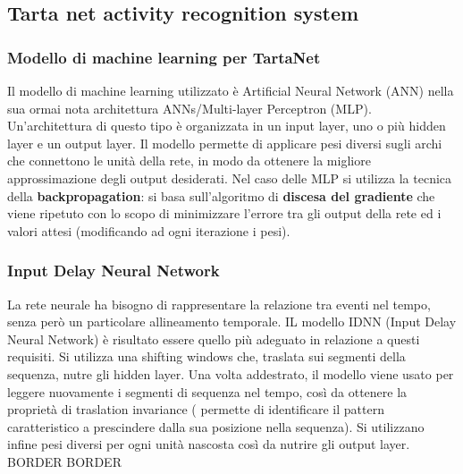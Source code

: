 \documentclass[12pt]{article}
\begin{document}
 		\subsection{Tarta net activity recognition system}
 			\subsubsection{Modello di machine learning per TartaNet}
 				Il modello di machine learning utilizzato è Artificial Neural Network (ANN) nella sua ormai nota architettura ANNs/Multi-layer Perceptron (MLP). Un'architettura di questo tipo è organizzata in un input layer, uno o più hidden layer e un output layer. Il modello permette di applicare pesi diversi sugli archi che connettono le unità della rete, in modo da ottenere la migliore approssimazione degli output desiderati. Nel caso delle MLP si utilizza la tecnica della \textbf{backpropagation}: si basa sull'algoritmo di \textbf{discesa del gradiente} che viene ripetuto con lo scopo di minimizzare l'errore tra gli output della rete ed i valori attesi (modificando ad ogni iterazione i pesi).
 			\subsubsection{Input Delay Neural Network}
 				La rete neurale ha bisogno di rappresentare la relazione tra eventi nel tempo, senza però un particolare allineamento temporale. IL modello IDNN (Input Delay Neural Network) è risultato essere quello più adeguato in relazione a questi requisiti. Si utilizza una shifting windows che, traslata sui segmenti della sequenza, nutre gli hidden layer. Una volta addestrato, il modello viene usato per leggere nuovamente i segmenti di sequenza nel tempo, così da ottenere la proprietà di traslation invariance ( permette di identificare il pattern caratteristico a prescindere dalla sua posizione nella sequenza). Si utilizzano infine pesi diversi per ogni unità nascosta così da nutrire gli output layer.
 				BORDER BORDER
\end{document}
